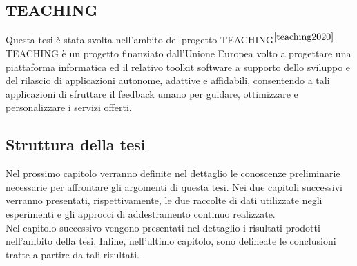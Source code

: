 \subsection*{TEACHING}
Questa tesi è stata svolta nell'ambito del progetto TEACHING$^{\cite{teaching2020}}$.\\TEACHING è un progetto finanziato dall'Unione Europea volto a progettare una piattaforma informatica ed il relativo toolkit software a supporto dello sviluppo e del rilascio di applicazioni autonome, adattive e affidabili, consentendo a tali applicazioni di sfruttare il feedback umano per guidare, ottimizzare e personalizzare i servizi offerti.

\subsection*{Struttura della tesi}
Nel prossimo capitolo verranno definite nel dettaglio le conoscenze preliminarie necessarie per affrontare gli argomenti di questa tesi. Nei due capitoli successivi verranno presentati, rispettivamente, le due raccolte di dati utilizzate negli esperimenti e gli approcci di addestramento continuo realizzate.\\
Nel capitolo successivo vengono presentati nel dettaglio i risultati prodotti nell'ambito della tesi. Infine, nell'ultimo capitolo, sono delineate le conclusioni tratte a partire da tali risultati.